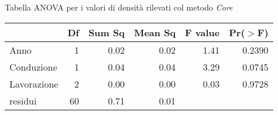 \begin{frame}{Tabella ANOVA per i valori di densità rilevati col metodo \emph{Core}} 
  \begin{table}[ht]
    \centering
    \label{tab:anova del modello}
    \begin{tabular}{lrrrrr}
      \hline
      & Df & Sum Sq & Mean Sq & F value & Pr($>$F) \\ 
      \hline
      Anno & 1 & 0.02 & 0.02 & 1.41 & 0.2390 \\ 
      Conduzione & 1 & 0.04 & 0.04 & 3.29 & 0.0745 \\ 
      Lavorazione & 2 & 0.00 & 0.00 & 0.03 & 0.9728 \\ 
      residui & 60 & 0.71 & 0.01 &  &  \\ 
      \hline
    \end{tabular}
  \end{table}
\end{frame}



